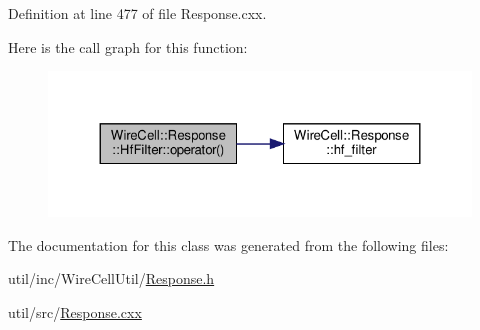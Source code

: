 Definition at line 477 of file Response.\+cxx.

Here is the call graph for this function\+:
\nopagebreak
\begin{figure}[H]
\begin{center}
\leavevmode
\includegraphics[width=324pt]{class_wire_cell_1_1_response_1_1_hf_filter_afef6eabeb4c0632352c574f6f263405b_cgraph}
\end{center}
\end{figure}


The documentation for this class was generated from the following files\+:\begin{DoxyCompactItemize}
\item 
util/inc/\+Wire\+Cell\+Util/\hyperlink{_response_8h}{Response.\+h}\item 
util/src/\hyperlink{_response_8cxx}{Response.\+cxx}\end{DoxyCompactItemize}
